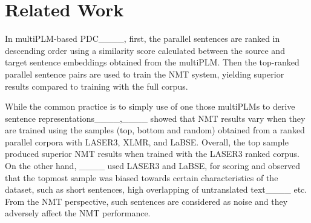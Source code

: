\section{Related Work}
\label{sec:related_work}




In multiPLM-based PDC____, first, the parallel sentences are ranked in descending order using a similarity score calculated between the source and target sentence embeddings obtained from the multiPLM. Then the top-ranked parallel sentence pairs are used to train the NMT system, yielding superior results compared to training with the full corpus. %


While the common practice is to simply use of one those multiPLMs to derive sentence representations____,____ showed that NMT results vary when they are trained using the samples (top, bottom and random) obtained from a ranked parallel corpora with LASER3, XLMR, and LaBSE. Overall, the top sample produced superior NMT results when trained with the LASER3 ranked corpus. On the other hand, ____ used LASER3 and LaBSE, for scoring and observed that the topmost sample was biased towards certain characteristics of the dataset, such as short sentences, high overlapping of untranslated text____ etc. From the NMT perspective, such sentences are considered as noise and they adversely affect the NMT performance.

